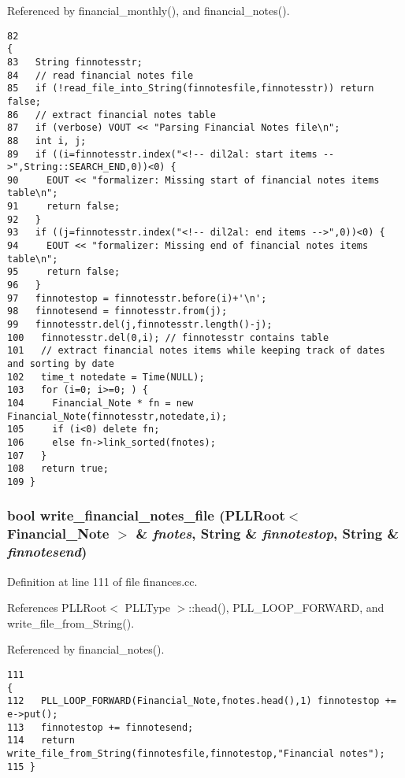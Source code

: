 Referenced by financial\_\-monthly(), and financial\_\-notes().



\footnotesize\begin{verbatim}82                                                                                                              {
83   String finnotesstr;
84   // read financial notes file
85   if (!read_file_into_String(finnotesfile,finnotesstr)) return false;
86   // extract financial notes table
87   if (verbose) VOUT << "Parsing Financial Notes file\n";
88   int i, j;
89   if ((i=finnotesstr.index("<!-- dil2al: start items -->",String::SEARCH_END,0))<0) {
90     EOUT << "formalizer: Missing start of financial notes items table\n";
91     return false;
92   }
93   if ((j=finnotesstr.index("<!-- dil2al: end items -->",0))<0) {
94     EOUT << "formalizer: Missing end of financial notes items table\n";
95     return false;
96   }
97   finnotestop = finnotesstr.before(i)+'\n';
98   finnotesend = finnotesstr.from(j);
99   finnotesstr.del(j,finnotesstr.length()-j);
100   finnotesstr.del(0,i); // finnotesstr contains table
101   // extract financial notes items while keeping track of dates and sorting by date
102   time_t notedate = Time(NULL);
103   for (i=0; i>=0; ) {
104     Financial_Note * fn = new Financial_Note(finnotesstr,notedate,i);
105     if (i<0) delete fn;
106     else fn->link_sorted(fnotes);
107   }
108   return true;
109 }
\end{verbatim}\normalsize 
{}
\subsubsection{\setlength{\rightskip}{0pt plus 5cm}bool write\_\-financial\_\-notes\_\-file ({\bf PLLRoot}$<$ {\bf Financial\_\-Note} $>$ \& {\em fnotes}, {\bf String} \& {\em finnotestop}, {\bf String} \& {\em finnotesend})}\label{finances_8cc_a1}




Definition at line 111 of file finances.cc.

References PLLRoot$<$ PLLType $>$::head(), PLL\_\-LOOP\_\-FORWARD, and write\_\-file\_\-from\_\-String().

Referenced by financial\_\-notes().



\footnotesize\begin{verbatim}111                                                                                                               {
112   PLL_LOOP_FORWARD(Financial_Note,fnotes.head(),1) finnotestop += e->put();
113   finnotestop += finnotesend;
114   return write_file_from_String(finnotesfile,finnotestop,"Financial notes");
115 }
\end{verbatim}\normalsize 
